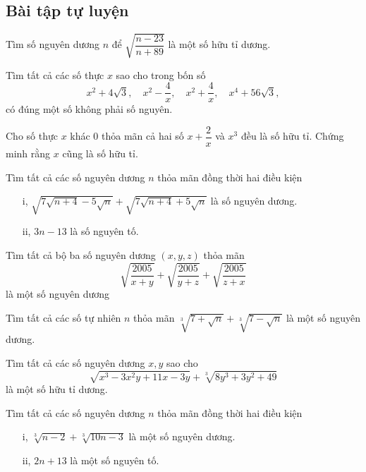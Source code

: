 \subsection*{Bài tập tự luyện}
\begin{btt}
Tìm số nguyên dương $n$ để $\sqrt{\dfrac{n-23}{n+89}}$ là một số hữu tỉ dương.
\end{btt}

\begin{btt}
Tìm tất cả các số thực $x$ sao cho trong bốn số
$$x^2+4\sqrt{3},\quad x^2-\dfrac{4}{x},\quad x^2+\dfrac{4}{x},\quad x^4+56\sqrt{3},$$ 
có đúng một số không phải số nguyên.
\end{btt}

\begin{btt}
Cho số thực $x$ khác $0$ thỏa mãn cả hai số $x+\dfrac{2}{x}$ và $x^3$ đều là số hữu tỉ. Chứng minh rằng $x$ cũng là số hữu tỉ.
\end{btt}

\begin{btt}
Tìm tất cả các số nguyên dương $n$ thỏa mãn đồng thời hai điều kiện
\begin{enumerate}
    \item[i,] $\sqrt{7\sqrt{n+4}-5\sqrt{n}}+\sqrt{7\sqrt{n+4}+5\sqrt{n}}$ là số nguyên dương.
    \item[ii,] $3n-13$ là số nguyên tố.
\end{enumerate}

\end{btt}

\begin{btt}
Tìm tất cả bộ ba số nguyên dương $(x,y,z)$ thỏa mãn
$$\sqrt{\dfrac{2005}{x+y}}+\sqrt{\dfrac{2005}{y+z}}+\sqrt{\dfrac{2005}{z+x}}$$
là một số nguyên dương
\end{btt}

\begin{btt}
Tìm tất cả các số tự nhiên $n$ thỏa mãn $\sqrt[3]{7+\sqrt{n}}+\sqrt[3]{7-\sqrt{n}}$
là một số nguyên dương.
\end{btt}

\begin{btt}
Tìm tất cả các số nguyên dương $x,y$ sao cho $$\sqrt{x^3-3x^2y+11x-3y}+\sqrt[3]{8y^3+3y^2+49}$$
là một số hữu tỉ dương.
\end{btt}

\begin{btt}
Tìm tất cả các số nguyên dương $n$ thỏa mãn đồng thời hai điều kiện
\begin{itemize}
    \item[i,] $\sqrt[3]{n-2}+\sqrt[3]{10n-3}$ là một số nguyên dương.
    \item[ii,] $2n+13$ là một số nguyên tố.
\end{itemize}
\end{btt}

